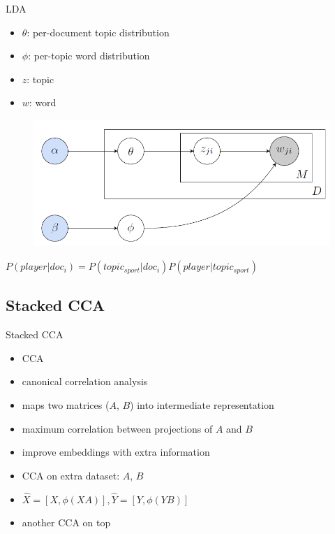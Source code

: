 \documentclass[16pt]{beamer}
\newenvironment{wideitemize}{\itemize\addtolength{\itemsep}{10pt}}{\enditemize}
\begin{document}
\begin{frame}{LDA}
\begin{itemize}
\item $\theta$: per-document topic distribution
\item $\phi$: per-topic word distribution
\item $z$: topic
\item $w$: word
\end{itemize}
\begin{figure}[tb]
           \centering
           \includegraphics[width=0.6\linewidth]{lda.png}
           \end{figure}
$P(player|doc_i) = P(topic_{sport} | doc_i) P(player | topic_{sport})$

\end{frame}

\subsection{Stacked CCA}%
\begin{frame}{Stacked CCA }{\cite{Gong2014}}
\begin{itemize}
\item CCA
    \begin{wideitemize}
    \item canonical correlation analysis
    \item maps two matrices ($A$, $B$) into intermediate representation
    \item maximum correlation between projections of $A$ and $B$ 
    \end{wideitemize}
\item improve embeddings with extra information
\begin{wideitemize}
\item CCA on extra dataset: $A$, $B$
\item $\hat X = [ X, \phi(XA)], \hat Y = [ Y, \phi(YB)]$
\item another CCA on top

\end{wideitemize}

\end{itemize}

\end{frame}
\end{document}
